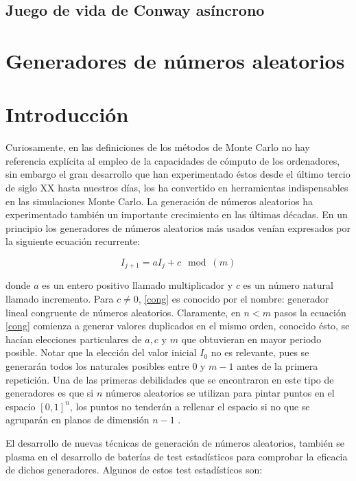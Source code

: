 \documentclass[../proyecto.tex]{memoir}
\begin{document}
\subsection{Juego de vida de Conway asíncrono}

\begin{defi}
\end{defi}


\section{Generadores de números aleatorios}

\section{Introducción}

Curiosamente, en las definiciones de los métodos de Monte Carlo no hay referencia explícita al empleo de la capacidades de cómputo de los ordenadores, sin embargo el gran desarrollo que han experimentado éstos desde el último tercio de siglo XX hasta nuestros días, los ha convertido en herramientas indispensables en las simulaciones Monte Carlo. La generación de números aleatorios ha experimentado también un importante crecimiento en las últimas décadas. En un principio los generadores de números aleatorios  más usados venían expresados por la siguiente ecuación recurrente:

\begin{equation} \label{cong}
I_{j+1} = aI_{j} +c \mod (m)
\end{equation}

donde $a$ es un entero positivo llamado multiplicador y $c$ es un número natural llamado incremento. Para $c \neq 0$, \ref{cong} es conocido por el nombre: generador lineal congruente de números aleatorios. Claramente, en $n<m$ pasos la ecuación \ref{cong} comienza a generar valores duplicados en el mismo orden, conocido ésto, se hacían elecciones particulares de $a,c$ y $m$ que obtuvieran en mayor periodo posible. Notar que la elección del valor inicial $I_{0}$ no es relevante, pues se generarán todos los naturales posibles entre $0$ y $m-1$ antes de la primera repetición. Una de las primeras debilidades que se encontraron en este tipo de generadores es que si $n$ números aleatorios se utilizan para pintar puntos en el espacio $[0,1]^{n}$, los puntos no tenderán a rellenar el espacio si no que se agruparán en planos de dimensión $n-1$ \cite{planos}. 

El desarrollo de nuevas técnicas de generación de números aleatorios, también se plasma en el desarrollo de baterías de test estadísticos para comprobar la eficacia de dichos generadores. Algunos de estos test estadísticos son:
\end{document}
